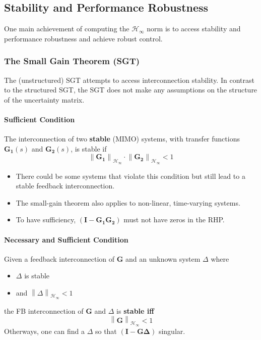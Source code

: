 \subsection{Stability and Performance Robustness}
One main achievement of computing the $\mathcal{H}_\infty$ norm is to access stability and performance robustness and achieve robust control.
\subsubsection{The Small Gain Theorem (SGT)}
The (unstructured) SGT attempts to access interconnection stability. In contrast to the structured SGT, the SGT does not make any assumptions on the structure of the uncertainty matrix.

\paragraph{Sufficient Condition}

The interconnection of two \textbf{stable} (MIMO) systems, with transfer functions $\mathbf{G_1}(s)$ and $\mathbf{G_2}(s)$, is stable if
\begin{equation*}
    \left\|\mathbf{G_1}\right\|_{\mathcal{H}_\infty}\cdot\left\|\mathbf{G_2}\right\|_{\mathcal{H}_\infty}<1
\end{equation*}

\begin{itemize}
    \item There could be some systems that violate this condition but still lead to a stable feedback interconnection.
    \item The small-gain theorem also applies to non-linear, time-varying systems.
    \item To have sufficiency, $(\mathbf{I}-\mathbf{G_1G_2})$ must not have zeros in the RHP.
\end{itemize}

\paragraph{Necessary and Sufficient Condition}
Given a feedback interconnection of $\mathbf{G}$ and an unknown system $\Delta$ where
\begin{itemize}
    \item $\Delta$ is stable
    \item and $\left\|\Delta\right\|_{\mathcal{H}_\infty}<1$
\end{itemize}
the FB interconnection of $\mathbf{G}$ and $\Delta$ is \textbf{stable iff}
\begin{equation*}
    \left\|\mathbf{G}\right\|_{\mathcal{H}_\infty}<1
\end{equation*}
Otherways, one can find a $\Delta$ so that $(\mathbf{I}-\mathbf{G\Delta})$ singular.\\

